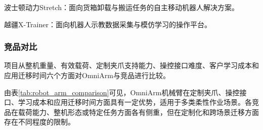 \documentclass[zihao=-4]{ctexart}
\begin{document}
波士顿动力Stretch：面向货箱卸载与搬运任务的自主移动机器人解决方案。

越疆X-Trainer：面向机器人示教数据采集与模仿学习的操作平台。

\subsubsection{竞品对比}

项目从整机重量、有效载荷、定制夹爪支持能力、操控接口难度、客户学习成本和应用迁移时间六个方面对OmniArm与竞品进行比较。


由表\ref{tab:robot_arm_comparison}可见，OmniArm机械臂在定制夹爪、操控接口、学习成本和应用迁移时间方面具有一定优势，适用于多类柔性作业场景。各竞品在载荷能力、整机形态或特定任务方面各有侧重，但在定制化和跨场景迁移方面存在不同程度的限制。
\end{document}
